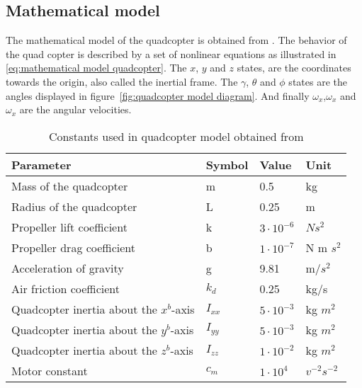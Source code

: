 \subsection{Mathematical model}
The mathematical model of the quadcopter is obtained from \cite{Agudelo}. The behavior of the quad copter is described by a set of nonlinear equations as illustrated in \eqref{eq:mathematical model quadcopter}. The $x$, $y$ and $z$ states, are the coordinates towards the origin, also called the inertial frame. The $\gamma$, $\theta$ and $\phi$ states are the angles displayed in figure~\ref{fig:quadcopter model diagram}. And finally $\omega_x$,$\omega_x$ and $\omega_x$ are the angular velocities.

\begin{table}[]
	\centering
	\caption{Constants used in quadcopter model obtained from \cite{Agudelo}}
	\label{btl:quadcopter model constants}
	\begin{tabular}{|l|l|l|l|}
		\hline
		Parameter                               & Symbol   & Value             & Unit           \\ \hline
		Mass of the quadcopter                  & m        & 0.5               & kg             \\
		Radius of the quadcopter                & L        & 0.25              & m              \\
		Propeller lift coefficient              & k        & $3 \cdot 10^{-6}$ & $Ns^2$        \\
		Propeller drag coefficient              & b        & $1 \cdot 10^{-7}$ & N m $s^2$      \\
		Acceleration of gravity                 & g        & 9.81              & m/$s^2$        \\
		Air friction coefficient                & $k_d$    & 0.25              & kg/s           \\
		Quadcopter inertia about the $x^b$-axis & $I_{xx}$ & $5 \cdot 10^{-3}$ & kg $m^2$       \\
		Quadcopter inertia about the $y^b$-axis & $I_{yy}$ & $5 \cdot 10^{-3}$ & kg $m^2$       \\
		Quadcopter inertia about the $z^b$-axis & $I_{zz}$ & $1 \cdot 10^{-2}$ & kg $m^2$       \\ 
		Motor constant                          & $c_m$    & $1 \cdot 10^{4}$  & $v^{-2}s^{-2}$ \\
		\hline
	\end{tabular}
\end{table}

